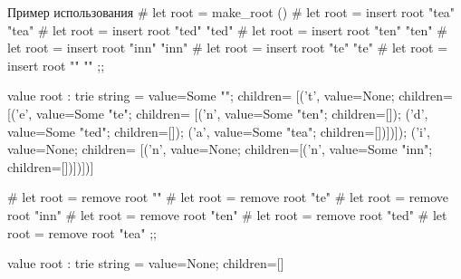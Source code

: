 

\begin{ocamllst}{Пример использования}{}
# let root = make_root ()
# let root = insert root "tea" "tea"
# let root = insert root "ted" "ted"
# let root = insert root "ten" "ten"
# let root = insert root "inn" "inn"
# let root = insert root "te" "te"
# let root = insert root "" "" ;;

value root : trie string =
  {value=Some "";
   children=
    [('t',
     {value=None;
      children=
       [('e',
        {value=Some "te";
         children=
          [('n', {value=Some "ten"; children=[]});
           ('d', {value=Some "ted"; children=[]});
           ('a', {value=Some "tea"; children=[]})]})]});
     ('i',
     {value=None;
      children=
       [('n',
        {value=None; children=[('n', {value=Some "inn"; children=[]})]})]})]}

# let root = remove root ""
# let root = remove root "te"
# let root = remove root "inn"
# let root = remove root "ten"
# let root = remove root "ted"
# let root = remove root "tea" ;;

value root : trie string = {value=None; children=[]}
\end{ocamllst}
